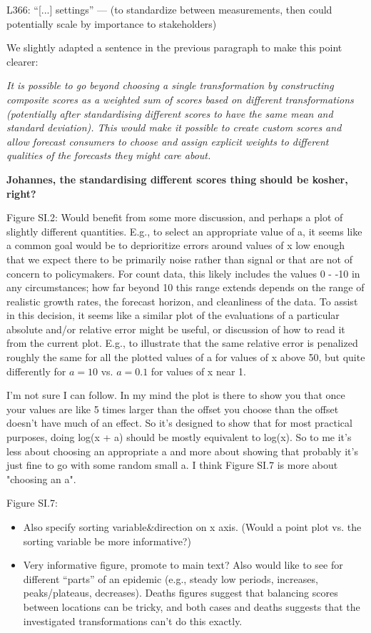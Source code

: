 \documentclass{article}
\newcommand{\red}{\color{red}}
\newcommand{\black}{\color{black}}
\newcommand{\blue}{\color{blue}}
\begin{document}
\blue
L366: “[...] settings” — (to standardize between measurements, then
could potentially scale by importance to stakeholders)

\black
We slightly adapted a sentence in the previous paragraph to make this point clearer: 

\textit{It is possible to go beyond choosing a single transformation by constructing composite scores as a weighted sum of scores based on different transformations (potentially after standardising different scores to have the same mean and standard deviation). This would make it possible to create custom scores and allow forecast consumers to choose and assign explicit weights to different qualities of the forecasts they might care about.}

\textbf{Johannes, the standardising different scores thing should be kosher, right?}

\red
Figure SI.2: Would benefit from some more discussion, and perhaps a plot of slightly different quantities. E.g., to select an appropriate value of a, it seems like a common goal would be to deprioritize errors around values of x low enough that we expect there to be primarily noise rather than signal or that are not of concern to policymakers. For count data, this likely includes the values 0 - -10 in any circumstances; how far beyond 10 this range extends depends on the range of realistic growth rates, the forecast horizon, and cleanliness of the data. To assist in this decision, it seems like a similar plot of the evaluations of a particular absolute and/or relative error might be useful, or discussion of how to read it from the current plot. E.g., to illustrate that the same relative error is penalized roughly the same for all the plotted values of a for values of x above 50, but quite differently for $a = 10$ vs. $a = 0.1$ for values of x near 1.

\black
I'm not sure I can follow. In my mind the plot is there to show you that once your values are like 5 times larger than the offset you choose than the offset doesn't have much of an effect. So it's designed to show that for most practical purposes, doing log(x + a) should be mostly equivalent to log(x). So to me it's less about choosing an appropriate a and more about showing that probably it's just fine to go with some random small a. I think Figure SI.7 is more about "choosing an a". 

\red
Figure SI.7:
\begin{itemize}
    \blue
    \item Also specify sorting variable\&direction on x axis. (Would a point plot vs. the sorting variable be more informative?)
    \red
    \item Very informative figure, promote to main text? Also would like to see for different “parts” of an epidemic (e.g., steady low periods, increases, peaks/plateaus, decreases). Deaths figures suggest that balancing scores between locations can be tricky, and both cases and deaths suggests that the investigated transformations can’t do this exactly.
\end{itemize}
\end{document}
